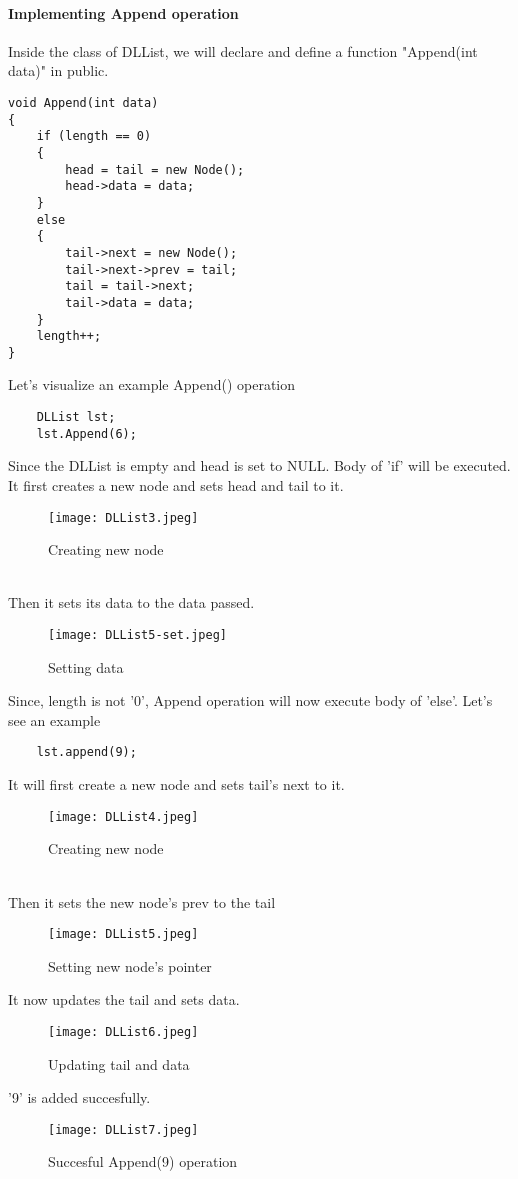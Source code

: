 \documentclass[11pt,fleqn]{book} %
\begin{document}
\paragraph{Implementing Append operation}
Inside the class of DLList, we will declare and define a function "Append(int data)" in public.
\begin{lstlisting}
void Append(int data)
{
	if (length == 0)
	{
		head = tail = new Node();
		head->data = data;
	}
	else
	{
		tail->next = new Node();
		tail->next->prev = tail;
		tail = tail->next;
		tail->data = data;
	}
	length++;
}

\end{lstlisting}
\begin{example}
	Let's visualize an example Append() operation\\
	\begin{lstlisting}
	DLList lst;
	lst.Append(6);
	\end{lstlisting}
	Since the DLList is empty and head is set to NULL. Body of 'if' will be executed.\\
	It first creates a new node and sets head and tail to it.\\
	\begin{figure}[H]
		\centering
		\texttt{[image: DLList3.jpeg]}
		\caption{Creating new node}
	\end{figure}
	~\\
	Then it sets its data to the data passed.
	\begin{figure}[H]
		\centering
		\texttt{[image: DLList5-set.jpeg]}
		\caption{Setting data}
	\end{figure}
\end{example}
Since, length is not '0', Append operation will now execute body of 'else'. Let's see an example
\begin{example}
	\begin{lstlisting}
	lst.append(9);
	\end{lstlisting}
	It will first create a new node and sets tail's next to it.
	\begin{figure}[H]
		\centering
		\texttt{[image: DLList4.jpeg]}
		\caption{Creating new node}
	\end{figure} ~\\
	Then it sets the new node's prev to the tail
	\begin{figure}[H]
		\centering
		\texttt{[image: DLList5.jpeg]}
		\caption{Setting new node's pointer}
	\end{figure}
	It now updates the tail and sets data.
	\begin{figure}[H]
		\centering
		\texttt{[image: DLList6.jpeg]}
		\caption{Updating tail and data}
	\end{figure}
	'9' is added succesfully.
	{\begin{figure}[H]
			\centering
			\texttt{[image: DLList7.jpeg]}
			\caption{Succesful Append(9) operation}
	\end{figure}}
\end{example}
\end{document}
